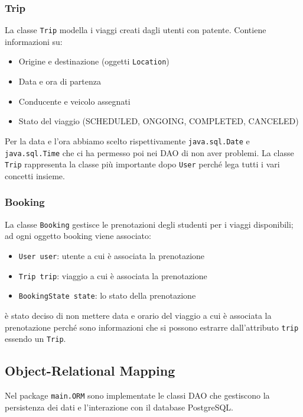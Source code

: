 \subsubsection{Trip}
La classe \texttt{Trip} modella i viaggi creati dagli utenti con patente. Contiene informazioni su:
\begin{itemize}
\item Origine e destinazione (oggetti \texttt{Location})
\item Data e ora di partenza
\item Conducente e veicolo assegnati
\item Stato del viaggio (SCHEDULED, ONGOING, COMPLETED, CANCELED)
\end{itemize}
Per la data e l'ora abbiamo scelto rispettivamente \texttt{java.sql.Date} e \texttt{java.sql.Time} che ci ha permesso poi nei DAO di non aver problemi.
La classe \texttt{Trip} rappresenta la classe più importante dopo \texttt{User} perché lega tutti i vari concetti insieme.
\subsubsection{Booking}
La classe \texttt{Booking} gestisce le prenotazioni degli studenti per i viaggi disponibili; ad ogni oggetto booking viene associato:
\begin{itemize}
    \item \texttt{User user}: utente a cui è associata la prenotazione
    \item \texttt{Trip trip}: viaggio a cui è associata la prenotazione
    \item \texttt{BookingState state}: lo stato della prenotazione
\end{itemize}
è stato deciso di non mettere data e orario del viaggio a cui è associata la prenotazione perché sono informazioni che si possono estrarre dall'attributo \texttt{trip} essendo un \texttt{Trip}.

\subsection{Object-Relational Mapping}
Nel package \texttt{main.ORM} sono implementate le classi DAO che gestiscono la persistenza dei dati e l'interazione con il database PostgreSQL.
